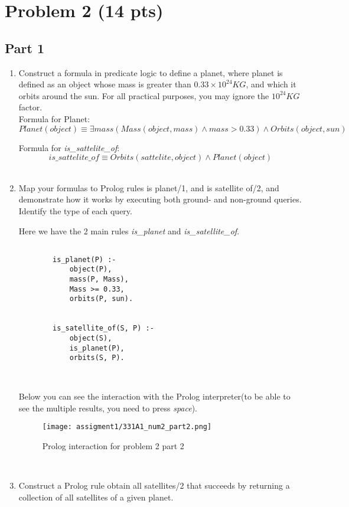 \newpage

\section{Problem 2 (14 pts)}

\subsection{Part 1}
\begin{enumerate}
\item Construct a formula in predicate logic to define a planet, where planet is defined
as an object whose mass is greater than $0.33 \times 10^{24}KG$, and which it orbits around the
sun. For all practical purposes, you may ignore the $10^{24}KG$ factor.\\

Formula for Planet:
\[\textit{Planet}(\textit{object}) \equiv \exists \textit{mass} \left( \textit{Mass}(\textit{object}, \textit{mass}) \land \textit{mass} > 0.33 \right) \land \textit{Orbits}(\textit{object}, \textit{sun})\]

Formula for \textit{is\_sattelite\_of}:
\[\textit{is\_sattelite\_of} \equiv \textit{Orbits}(\textit{sattelite}, \textit{object}) \land \textit{Planet}(\textit{object})\]
\\
\item Map your formulas to Prolog rules is planet/1, and is satellite of/2, and demonstrate how it works by executing both ground- and non-ground queries. Identify the type of each query.

Here we have the 2 main rules \textit{is\_planet} and
\textit{is\_satellite\_of}. 
    \begin{lstlisting}
    
        is_planet(P) :-
            object(P),
            mass(P, Mass),
            Mass >= 0.33,
            orbits(P, sun).

            
        is_satellite_of(S, P) :-
            object(S),
            is_planet(P),
            orbits(S, P).

            
    \end{lstlisting}

Below you can see the interaction with the Prolog interpreter(to be able to see the multiple results, you need to press \textit{space}).
    \begin{figure}[hbt!]
        \centering
        \texttt{[image: assigment1/331A1\_num2\_part2.png]}
        \caption{Prolog interaction for problem 2 part 2}
    \end{figure}\\
\newpage    
\item Construct a Prolog rule obtain all satellites/2 that succeeds by returning a collection of all satellites of a given planet.


\end{enumerate}
